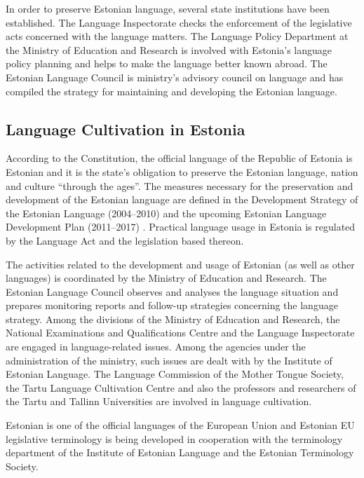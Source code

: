 \begin{multicols}{2}
In order to preserve Estonian language, several state institutions have been established. 
The Language Inspectorate checks the enforcement of the legislative acts concerned with the language matters. 
The Language Policy Department at the Ministry of Education and Research is involved with Estonia's language policy planning and helps to make the language better known abroad. 
The Estonian Language Council is ministry's advisory council on language and has compiled the strategy for maintaining and developing the Estonian language.

\subsection{Language Cultivation in Estonia}

According to the Constitution, the official language of the Republic of Estonia is Estonian and it is the state's obligation to preserve the Estonian language, nation and culture ``through the ages''. 
The measures necessary for the preservation and development of the Estonian language are deﬁned in the Development Strategy of the Estonian Language (2004--2010) \cite{KeeleStratEn} and the upcoming Estonian Language Development Plan (2011--2017) \cite{DevPlan}. 
Practical language usage in Estonia is regulated by the Language Act and the legislation based thereon.


The activities related to the development and usage of Estonian (as well as other languages) is coordinated by the Ministry of Education and Research. 
The Estonian Language Council observes and analyses the language situation and prepares monitoring reports and follow-up strategies concerning the language strategy. 
Among the divisions of the Ministry of Education and Research, the National Examinations and Qualiﬁcations Centre and the Language Inspectorate are engaged in language-related issues. 
Among the agencies under the administration of the ministry, such issues are dealt with by the Institute of Estonian Language. 
The Language Commission of the Mother Tongue Society, the Tartu Language Cultivation Centre and also the professors and researchers of the Tartu and Tallinn Universities are involved in language cultivation.

Estonian is one of the official languages of the European Union and Estonian EU legislative terminology is being developed in cooperation with the terminology department of the Institute of Estonian Language and the Estonian Terminology Society.


\end{multicols}
